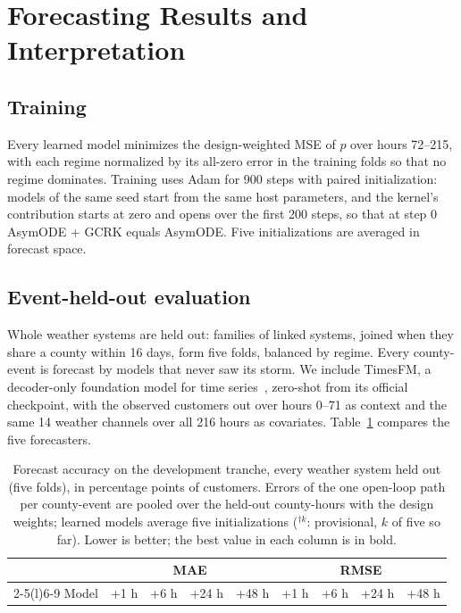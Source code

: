\documentclass[10pt,twocolumn,letterpaper]{article}
\begin{document}
\section{Forecasting Results and Interpretation}
\subsection{Training}
Every learned model minimizes the design-weighted MSE of $p$ over hours 72--215, with each regime normalized by its
all-zero error in the training folds so that no regime dominates. Training uses Adam for 900 steps with paired
initialization: models of the same seed start from the same host parameters, and the kernel's contribution starts at
zero and opens over the first 200 steps, so that at step 0 AsymODE + GCRK equals AsymODE. Five initializations are averaged in forecast space.

\subsection{Event-held-out evaluation}
Whole weather systems are held out: families of linked systems, joined when they share a county within 16 days, form
five folds, balanced by regime. Every county-event is forecast by models that never saw its storm. We include TimesFM, a
decoder-only foundation model for time series~\cite{das2024}, zero-shot from its official checkpoint, with the observed
customers out over hours 0--71 as context and the same 14 weather channels over all 216 hours as covariates.
Table~\ref{tab:accuracy} compares the five forecasters.

\begin{table}[t]
\centering\small
\caption{Forecast accuracy on the development tranche, every weather system held out (five folds), in percentage
points of customers. Errors of the one open-loop path per county-event are pooled over the held-out county-hours with
the design weights; learned models average five initializations ($^{\dagger k}$: provisional, $k$ of five so far).
Lower is better; the best value in each column is in bold.}
\label{tab:accuracy}
\begin{tabular}{@{}lcccccccc@{}}
\toprule
 & \multicolumn{4}{c}{MAE} & \multicolumn{4}{c}{RMSE}\\
\cmidrule(lr){2-5}\cmidrule(l){6-9}
Model & +1 h & +6 h & +24 h & +48 h & +1 h & +6 h & +24 h & +48 h\\
\midrule

\bottomrule
\end{tabular}
\end{table}
\end{document}
